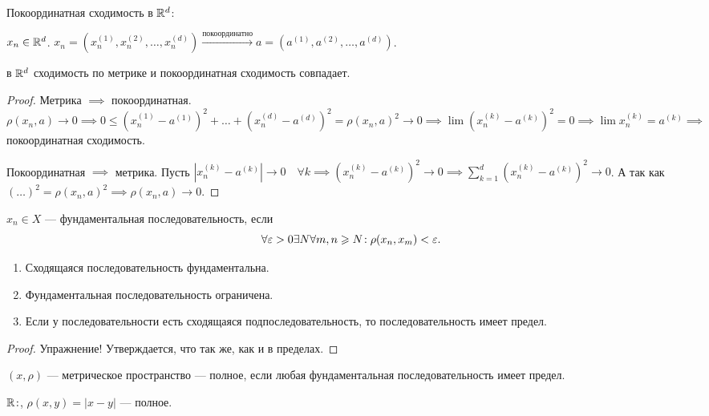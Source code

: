 \begin{definition}
    Покоординатная сходимость в $\mathbb{R}^d$:

    $x_n \in \mathbb{R}^d$.  $x_n = (x_n^{(1)}, x_n^{(2)}, \ldots, x_n^{(d)}) \xrightarrow{\text{покоординатно}} a = (a^{(1)}, a^{(2)}, \ldots, a^{(d)})$.
\end{definition}
\begin{theorem}
    в $\mathbb{R}^d$ сходимость по метрике и покоординатная сходимость совпадает.
\end{theorem}
\begin{proof}
    Метрика $\implies$ покоординатная.  $\rho(x_n, a) \to 0 \implies 0 \le (x_n^{(1)} - a^{(1)})^2 + \ldots + (x_n^{(d)} - a^{(d)})^2 = \rho(x_n, a)^2 \to 0 \implies \lim (x_n^{(k)} - a^{(k)})^2 = 0 \implies \lim x_n^{(k)} = a^{(k)} \implies$ покоординатная сходимость.

    Покоординатная $\implies$ метрика. Пусть  $|x_n^{(k)} - a^{(k)}| \to 0 \quad \forall k \implies (x_n^{(k)} - a^{(k)})^2 \to 0 \implies \sum\limits_{k=1}^d (x_n^{(k)} - a^{(k)})^2 \to 0$. А так как $(\ldots)^2 = \rho(x_n, a)^2 \implies \rho(x_n, a) \to 0$.
\end{proof}
\begin{definition}
    $x_n \in X$ --- фундаментальная последовательность, если
     \[
    \forall \varepsilon > 0 \exists N \forall m, n \geqslant N\!: \rho(x_n, x_m) < \varepsilon
    .\] 
\end{definition}
\begin{properties}
    \begin{enumerate}
        \item Сходящаяся последовательность фундаментальна.
        \item Фундаментальная последовательность ограничена.
        \item Если у последовательности есть сходящаяся подпоследовательность, то последовательность имеет предел.
    \end{enumerate}
\end{properties}
\begin{proof}
    Упражнение! Утверждается, что так же, как и в пределах.
\end{proof}
\begin{definition}
    $(x, \rho)$ --- метрическое пространство --- полное, если любая фундаментальная последовательность имеет предел.
\end{definition}
\begin{example}
    $\mathbb{R}\!:$,  $\rho(x, y) = |x-y|$ --- полное.
\end{example}
